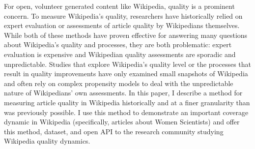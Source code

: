 For open, volunteer generated content like Wikipedia, quality is a prominent concern. To measure Wikipedia's quality, researchers have historically relied on expert evaluation or assessments of article quality by Wikipedians themselves. While both of these methods have proven effective for answering many questions about Wikipedia's quality and processes, they are both problematic: expert evaluation is expensive and Wikipedian quality assessments are sporadic and unpredictable. Studies that explore Wikipedia's quality level or the processes that result in quality improvements have only examined small snapshots of Wikipedia and often rely on complex propensity models to deal with the unpredictable nature of Wikipedians' own assessments. In this paper, I describe a method for measuring article quality in Wikipedia historically and at a finer granularity than was previously possible. I use this method to demonstrate an important coverage dynamic in Wikipedia (specifically, articles about Women Scientists) and offer this method, dataset, and open API to the research community studying Wikipedia quality dynamics.
